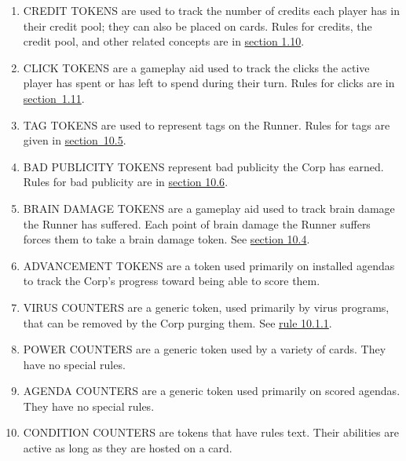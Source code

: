 \begin{enumerate}
	      \begin{enumerate}
		      \item CREDIT TOKENS are used to track the number of credits each player has in their credit pool; they can also be placed on cards. Rules for credits, the credit pool, and	other related concepts are in \hyperlink{page.i}{section 1.10}.
		      \item  CLICK TOKENS are a gameplay aid used to track the clicks the active player has spent or has left to spend during their turn. Rules for clicks are in \hyperlink{page.i}{section~1.11}.
		      \item  TAG TOKENS are used to represent tags on the Runner. Rules for tags are given in \hyperlink{page.i}{section~10.5}.
		      \item  BAD PUBLICITY TOKENS represent bad publicity the Corp has earned. Rules for bad publicity are in \hyperlink{page.i}{section 10.6}.
		      \item BRAIN DAMAGE TOKENS are a gameplay aid used to track brain damage the Runner has suffered. Each point of brain damage the Runner suffers forces them to take a brain damage token. See \hyperlink{page.i}{section 10.4}.
		      \item ADVANCEMENT TOKENS are a token used primarily on installed agendas to track the Corp's progress toward being able to score them.
		      \item VIRUS COUNTERS are a generic token, used primarily by virus programs, that can be removed by the Corp purging them. See \hyperlink{page.i}{rule 10.1.1}.
		      \item POWER COUNTERS are a generic token used by a variety of cards. They have no special rules.
		      \item AGENDA COUNTERS are a generic token used primarily on scored agendas. They  have no special rules.
		      \item CONDITION COUNTERS are tokens that have rules text. Their abilities are active as	long as they are hosted on a card.
	      \end{enumerate}
\end{enumerate}
